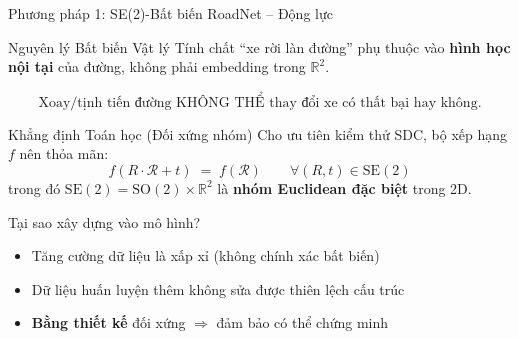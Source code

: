 \documentclass[aspectratio=169,10pt]{beamer}
\begin{document}
\begin{frame}{Phương pháp 1: SE(2)-Bất biến RoadNet -- Động lực}
\begin{block}{Nguyên lý Bất biến Vật lý}
\small
Tính chất ``xe rời làn đường'' phụ thuộc vào \textbf{hình học nội tại} của đường, không phải embedding trong $\mathbb{R}^2$.

\[
\text{Xoay/tịnh tiến đường KHÔNG THỂ thay đổi xe có thất bại hay không.}
\]
\end{block}

\begin{block}{Khẳng định Toán học (Đối xứng nhóm)}
\small
Cho ưu tiên kiểm thử SDC, bộ xếp hạng $f$ nên thỏa mãn:
\[
\boxed{f(R \cdot \mathcal{R} + t) \;=\; f(\mathcal{R}) \qquad \forall (R, t) \in \mathrm{SE}(2)}
\]
trong đó $\mathrm{SE}(2) = \mathrm{SO}(2) \times \mathbb{R}^2$ là \textbf{nhóm Euclidean đặc biệt} trong 2D.
\end{block}

\begin{block}{Tại sao xây dựng vào mô hình?}
\begin{itemize}\small
  \item Tăng cường dữ liệu là xấp xỉ (không chính xác bất biến)
  \item Dữ liệu huấn luyện thêm không sửa được thiên lệch cấu trúc
  \item \textbf{Bằng thiết kế} đối xứng $\Rightarrow$ đảm bảo có thể chứng minh
\end{itemize}
\end{block}
\end{frame}
\end{document}
